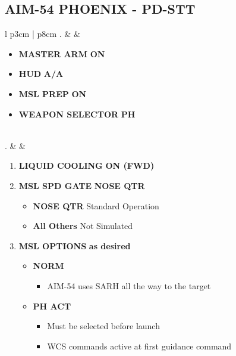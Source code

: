 \documentclass[8pt,usenames,dvipsnames,twoside]{article}
\begin{document}
		\subsection{AIM-54 PHOENIX - PD-STT}
		\begin{center}
			\begin{tabular}{l p{3cm} | p{8cm}}
				. &  & 
				\begin{minipage}[t]{\linewidth}
					\vspace{-7pt}
					\begin{itemize}
						\item \textbf{MASTER ARM} \dotfill \textbf{ON}
						\item \textbf{HUD} \dotfill \textbf{A/A}
						\item \textbf{MSL PREP} \dotfill \textbf{ON}
						\item \textbf{WEAPON SELECTOR} \dotfill \textbf{PH}
					\end{itemize} 
				\end{minipage} \\
				. &  & 
				\begin{minipage}[t]{\linewidth}
					\vspace{-7pt}
					\begin{enumerate}[label=(\alph*)]
						\item \textbf{LIQUID COOLING} \dotfill \textbf{ON (FWD)}
						\item \textbf{MSL SPD GATE} \dotfill \textbf{NOSE QTR}
						\begin{itemize}
							\item \textbf{NOSE QTR} Standard Operation
							\item \textbf{All Others} Not Simulated
						\end{itemize}
						\item \textbf{MSL OPTIONS} \dotfill \textbf{as desired}
						\begin{itemize}
							\item \textbf{NORM}
							\begin{itemize}
								\item AIM-54 uses SARH all the way to the target
							\end{itemize}
							\item \textbf{PH ACT}
							\begin{itemize}
								\item Must be selected before launch
								\item WCS commands active at first guidance command

\end{itemize}
\end{itemize}
\end{enumerate}
\end{minipage}
\end{tabular}
\end{center}
\end{document}
